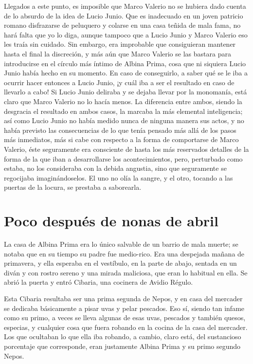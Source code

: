 \documentclass[11pt,openany]{book}
\begin{document}
Llegados a este punto, es imposible que Marco Valerio no se hubiera dado cuenta de lo absurdo de la idea de Lucio Junio. Que es inadecuado en un joven patricio romano disfrazarse de peluquero y colarse en una casa teñida de mala fama, no hará falta que yo lo diga, aunque tampoco que a Lucio Junio y Marco Valerio eso les traía sin cuidado. Sin embargo, era improbable que consiguieran mantener hasta el final la discreción, y más aún que Marco Valerio se las bastara para introducirse en el círculo más íntimo de Albina Prima, cosa que ni siquiera Lucio Junio había hecho en su momento. En caso de conseguirlo, a saber qué se le iba a ocurrir hacer entonces a Lucio Junio, ¡y cuál iba a ser el resultado en caso de llevarlo a cabo! Si Lucio Junio deliraba y se dejaba llevar por la monomanía, está claro que Marco Valerio no lo hacía menos. La diferencia entre ambos, siendo la desgracia el resultado en ambos casos, la marcaba la más elemental inteligencia; así como Lucio Junio no había medido nunca de ninguna manera sus actos, y no había previsto las consecuencias de lo que tenía pensado más allá de los pasos más inmediatos, más si cabe con respecto a la forma de comportarse de Marco Valerio, éste seguramente era consciente de hasta los más reservados detalles de la forma de la que iban a desarrollarse los acontecimientos, pero, perturbado como estaba, no los consideraba con la debida angustia, sino que seguramente se regocijaba imaginándoselos. El uno no olía la sangre, y el otro, tocando a las puertas de la locura, se prestaba a saborearla.

\chapter{Poco después de nonas de abril}

La casa de Albina Prima era lo único salvable de un barrio de mala muerte; se notaba que en su tiempo su padre fue medio-rico. Era una despejada mañana de primavera, y ella esperaba en el vestíbulo, en la parte de abajo, sentada en un diván y con rostro sereno y una mirada maliciosa, que eran lo habitual en ella. Se abrió la puerta y entró Cibaria, una cocinera de Avidio Régulo. 

Esta Cibaria resultaba ser una prima segunda de Nepos, y en casa del mercader se dedicaba básicamente a pisar uvas y pelar pescados. Eso sí, siendo tan infame como su primo, a veces se lleva algunas de esas uvas, pescados y también quesos, especias, y cualquier cosa que fuera robando en la cocina de la casa del mercader. Los que ocultaban lo que ella iba robando, a cambio, claro está, del sustancioso porcentaje que corresponde, eran justamente Albina Prima y su primo segundo Nepos. 
\end{document}
